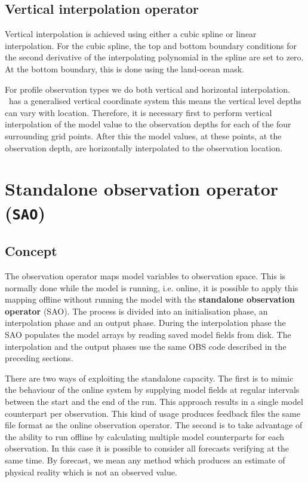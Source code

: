 \documentclass[../main/NEMO_manual]{subfiles}
\begin{document}
\subsection{Vertical interpolation operator}

Vertical interpolation is achieved using either a cubic spline or linear interpolation.
For the cubic spline, the top and bottom boundary conditions for the second derivative of
the interpolating polynomial in the spline are set to zero.
At the bottom boundary, this is done using the land-ocean mask.

For profile observation types we do both vertical and horizontal interpolation. \NEMO\ has a generalised vertical coordinate system this means the vertical level depths can vary with location. Therefore, it is necessary first to perform vertical interpolation of the model value to the observation depths for each of the four surrounding grid points. After this the model values, at these points, at the observation depth, are horizontally interpolated to the observation location.


\section{Standalone observation operator (\texttt{SAO})}
\label{sec:OBS_sao}

\subsection{Concept}

The observation operator maps model variables to observation space. This is normally done while the model is running, i.e. online, it is possible to apply this mapping offline without running the model with the \textbf{standalone observation operator} (SAO). The process is divided into an initialisation phase, an interpolation phase and an output phase.
During the interpolation phase the SAO populates the model arrays by
reading saved model fields from disk. The interpolation and the output phases use the same OBS code described in the preceding sections.

There are two ways of exploiting the standalone capacity.
The first is to mimic the behaviour of the online system by supplying model fields at
regular intervals between the start and the end of the run.
This approach results in a single model counterpart per observation.
This kind of usage produces feedback files the same file format as the online observation operator.
The second is to take advantage of the ability to run offline by calculating
multiple model counterparts for each observation.
In this case it is possible to consider all forecasts verifying at the same time.
By forecast, we mean any method which produces an estimate of physical reality which is not an observed value.
\end{document}
